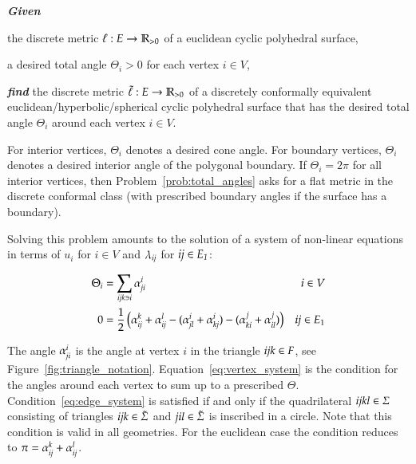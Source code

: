 \documentclass[Thesis]{subfiles}
\begin{document}
\begin{problem}
\label{prob:total_angles}
\textbf{\itshape{Given}}

\begin{compactitem}
\item the discrete metric $\ell:E\rightarrow\mathbb R_{>0}$ of a
euclidean cyclic polyhedral surface,
\item a desired total angle $\Theta_{i}>0$ for each vertex
$i\in V$,
\end{compactitem}

\smallskip\noindent%
\textbf{\itshape{find}} the discrete metric
$\tilde\ell:E\rightarrow\mathbb R_{>0}$ of a discretely
conformally equivalent euclidean/hyperbolic/spherical cyclic polyhedral surface that has
the desired total angle $\Theta_{i}$ around each vertex $i\in
V$.
\end{problem}

For interior vertices, $\Theta_i$ denotes a desired cone angle. For
boundary vertices, $\Theta_i$ denotes a desired interior angle of the
polygonal boundary. If $\Theta_{i}=2\pi$ for all interior vertices,
then Problem~\ref{prob:total_angles} asks for a flat metric in the
discrete conformal class (with prescribed boundary angles if the
surface has a boundary).

Solving this problem amounts to the solution of a system of non-linear 
equations in terms of $u_i$ for $i\in V$ and $\lambda_{\it ij}$ for $\it ij \in E_1$:

\begin{align}
	\Theta_i &=\sum_{\it ijk \ni i}\alpha_{\it ji}^i & i\in V\label{eq:vertex_system}\\
	0 &= \frac{1}{2}\left(\alpha_{\it ij}^k + \alpha_{\it ij}^l - (\alpha^i_{\it jl} + \alpha^i_{\it kj}) - (\alpha^j_{\it ki} + \alpha^j_{\it il})\right)& \textit{ij} \in E_1\label{eq:edge_system}
\end{align}

The angle $\alpha_{\it ji}^i$ is the angle at vertex $i$ in the triangle $\it ijk\in F$, see Figure~\ref{fig:triangle_notation}.
Equation~\ref{eq:vertex_system} is the condition for the angles around each vertex to sum up to a prescribed $\Theta$.
Condition~\ref{eq:edge_system} is satisfied if and only if the quadrilateral $\it ijkl\in \Sigma$ consisting of triangles $\it ijk\in \tilde \Sigma$ and $\it jil\in \tilde \Sigma$ is inscribed in a circle. Note that this condition is valid in all geometries. For the euclidean case the condition reduces to $\pi=\alpha_{\it ij}^k + \alpha_{\it ij}^l$.
\end{document}
